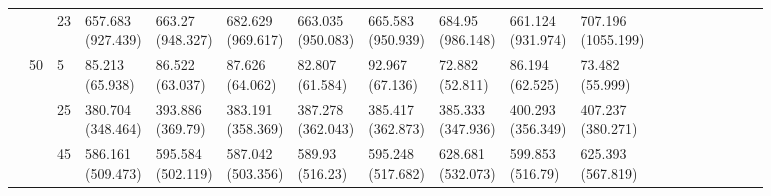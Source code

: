 \documentclass[12pt,a4paper]{article}
\begin{document}
\begin{landscape}
\begin{longtable}{lllllllllllrrrrrrrr}
 &  & 23 & \makecell{657.683 \\ (927.439)} & \makecell{663.27 \\ (948.327)} & \makecell{682.629 \\ (969.617)} & \makecell{663.035 \\ (950.083)} & \makecell{665.583 \\ (950.939)} & \makecell{684.95 \\ (986.148)} & \makecell{661.124 \\ (931.974)} & \makecell{707.196 \\ (1055.199)} \\
\cline{2-11}
 & \multirow[t]{3}{*}{50} & 5 & \makecell{85.213 \\ (65.938)} & \makecell{86.522 \\ (63.037)} & \makecell{87.626 \\ (64.062)} & \makecell{82.807 \\ (61.584)} & \makecell{92.967 \\ (67.136)} & \makecell{72.882 \\ (52.811)} & \makecell{86.194 \\ (62.525)} & \makecell{73.482 \\ (55.999)} \\
 &  & 25 & \makecell{380.704 \\ (348.464)} & \makecell{393.886 \\ (369.79)} & \makecell{383.191 \\ (358.369)} & \makecell{387.278 \\ (362.043)} & \makecell{385.417 \\ (362.873)} & \makecell{385.333 \\ (347.936)} & \makecell{400.293 \\ (356.349)} & \makecell{407.237 \\ (380.271)} \\
 &  & 45 & \makecell{586.161 \\ (509.473)} & \makecell{595.584 \\ (502.119)} & \makecell{587.042 \\ (503.356)} & \makecell{589.93 \\ (516.23)} & \makecell{595.248 \\ (517.682)} & \makecell{628.681 \\ (532.073)} & \makecell{599.853 \\ (516.79)} & \makecell{625.393 \\ (567.819)} \\
\cline{1-11} \cline{2-11}

\end{longtable}
\end{landscape}
\end{document}
